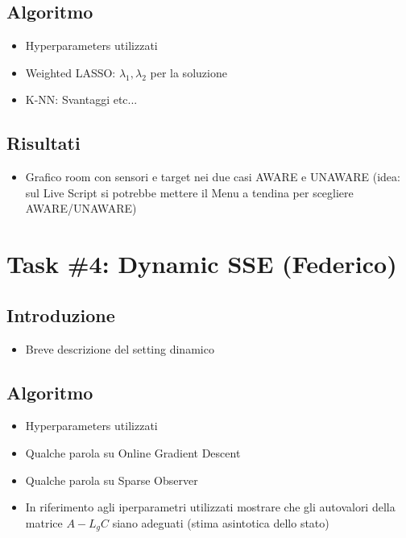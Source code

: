 \subsection*{Algoritmo}
\begin{itemize}
    \item Hyperparameters utilizzati
    \item Weighted LASSO: $\lambda_1, \lambda_2$ per la soluzione
    \item K-NN: Svantaggi etc...
\end{itemize}
\subsection*{Risultati}
\begin{itemize}
    \item Grafico room con sensori e target nei due casi AWARE e UNAWARE \textsf{(idea: sul Live Script si potrebbe mettere il Menu a tendina per scegliere AWARE/UNAWARE)}
\end{itemize}

\section*{Task \#4: Dynamic SSE (Federico)}
\subsection*{Introduzione}
\begin{itemize}
    \item Breve descrizione del setting dinamico
\end{itemize}
\subsection*{Algoritmo}
\begin{itemize}
    \item Hyperparameters utilizzati
    \item Qualche parola su Online Gradient Descent
    \item Qualche parola su Sparse Observer 
    \item In riferimento agli iperparametri utilizzati mostrare che gli autovalori della matrice $A-L_gC$ siano adeguati (stima asintotica dello stato)
\end{itemize}
